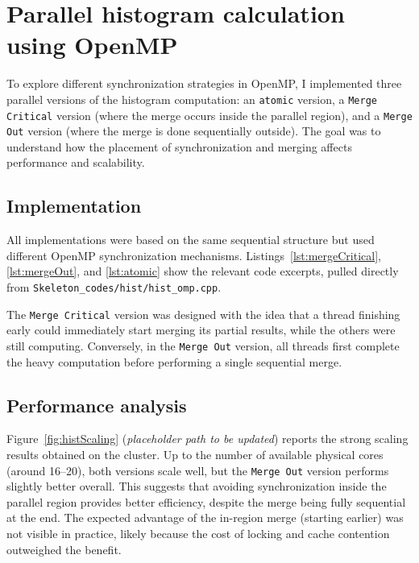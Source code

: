 \section{Parallel histogram calculation using OpenMP }

To explore different synchronization strategies in OpenMP, I implemented three parallel versions of the histogram computation: 
an \texttt{atomic} version, a \texttt{Merge Critical} version (where the merge occurs inside the parallel region), 
and a \texttt{Merge Out} version (where the merge is done sequentially outside).  
The goal was to understand how the placement of synchronization and merging affects performance and scalability.

\subsection*{Implementation}
All implementations were based on the same sequential structure but used different OpenMP synchronization mechanisms.  
Listings~\ref{lst:mergeCritical}, \ref{lst:mergeOut}, and \ref{lst:atomic} show the relevant code excerpts, pulled directly from \texttt{Skeleton\_codes/hist/hist\_omp.cpp}.







The \texttt{Merge Critical} version was designed with the idea that a thread finishing early could immediately start merging its partial results,
while the others were still computing.  
Conversely, in the \texttt{Merge Out} version, all threads first complete the heavy computation before performing a single sequential merge.

\subsection*{Performance analysis}
Figure~\ref{fig:histScaling} (\textit{placeholder path to be updated}) reports the strong scaling results obtained on the cluster.  
Up to the number of available physical cores (around 16–20), both versions scale well, but the \texttt{Merge Out} version performs slightly better overall.
This suggests that avoiding synchronization inside the parallel region provides better efficiency, despite the merge being fully sequential at the end.  
The expected advantage of the in-region merge (starting earlier) was not visible in practice, likely because the cost of locking and cache contention outweighed the benefit.

